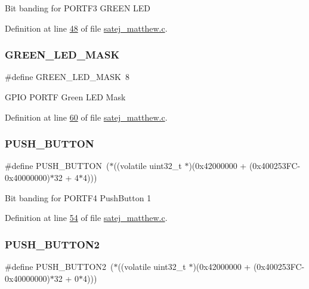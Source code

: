 Bit banding for P\+O\+R\+T\+F3 G\+R\+E\+EN L\+ED 

Definition at line \mbox{\hyperlink{satej__matthew_8c_source_l00048}{48}} of file \mbox{\hyperlink{satej__matthew_8c_source}{satej\+\_\+matthew.\+c}}.

\mbox{\label{satej__matthew_8c_a102cef24f52add2a38ee01eccbf27bcb}} 
\subsubsection{\texorpdfstring{GREEN\_LED\_MASK}{GREEN\_LED\_MASK}}
{\footnotesize\ttfamily \#define G\+R\+E\+E\+N\+\_\+\+L\+E\+D\+\_\+\+M\+A\+SK~8}

G\+P\+IO P\+O\+R\+TF Green L\+ED Mask 

Definition at line \mbox{\hyperlink{satej__matthew_8c_source_l00060}{60}} of file \mbox{\hyperlink{satej__matthew_8c_source}{satej\+\_\+matthew.\+c}}.

\mbox{\label{satej__matthew_8c_aebf19233811cf4cf11ddeb722b6a2850}} 
\subsubsection{\texorpdfstring{PUSH\_BUTTON}{PUSH\_BUTTON}}
{\footnotesize\ttfamily \#define P\+U\+S\+H\+\_\+\+B\+U\+T\+T\+ON~($\ast$((volatile uint32\+\_\+t $\ast$)(0x42000000 + (0x400253\+F\+C-\/0x40000000)$\ast$32 + 4$\ast$4)))}

Bit banding for P\+O\+R\+T\+F4 Push\+Button 1 

Definition at line \mbox{\hyperlink{satej__matthew_8c_source_l00054}{54}} of file \mbox{\hyperlink{satej__matthew_8c_source}{satej\+\_\+matthew.\+c}}.

\mbox{\label{satej__matthew_8c_afc15afb38fa2f0f9fb1448682c2fd356}} 
\subsubsection{\texorpdfstring{PUSH\_BUTTON2}{PUSH\_BUTTON2}}
{\footnotesize\ttfamily \#define P\+U\+S\+H\+\_\+\+B\+U\+T\+T\+O\+N2~($\ast$((volatile uint32\+\_\+t $\ast$)(0x42000000 + (0x400253\+F\+C-\/0x40000000)$\ast$32 + 0$\ast$4)))}

